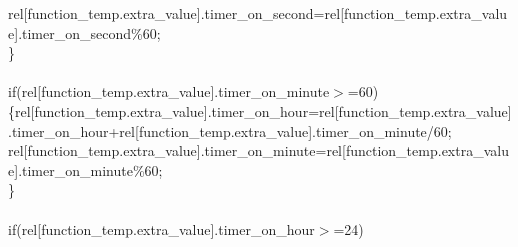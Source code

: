 \documentclass[a4paper, 12pt]{article}
\newcommand\SPC{\hspace*{0.6em}}
\newcommand{\CppAIdentifier}[1]{\textcolor[rgb]{0,1,0}{#1}}
\newcommand{\CppANumber}[1]{\textcolor[rgb]{0,0,1}{#1}}
\newcommand{\CppAReservedWord}[1]{\textcolor[rgb]{0,0.5,0}{#1}}
\newcommand{\CppASpace}[1]{\textcolor[rgb]{1,1,1}{\colorbox[rgb]{0,0,0}{#1}}}
\newcommand{\CppASymbol}[1]{\textcolor[rgb]{1,0,0}{#1}}
\begin{document}
\begin{ttfamily}
\CppASpace{\SPC \SPC \SPC }\CppAIdentifier{rel}\CppASymbol{[}\CppAIdentifier{function\_temp}\CppASymbol{.}\CppAIdentifier{extra\_value}\CppASymbol{]}\CppASymbol{.}\CppAIdentifier{timer\_on\_second}\CppASpace{\SPC }\CppASymbol{=}\CppASpace{\SPC }\CppAIdentifier{rel}\CppASymbol{[}\CppAIdentifier{function\_temp}\CppASymbol{.}\CppAIdentifier{extra\_value}\CppASymbol{]}\CppASymbol{.}\CppAIdentifier{timer\_on\_second}\CppASpace{\SPC }\CppASymbol{\%}\CppASpace{\SPC }\CppANumber{60}\CppASymbol{;}\\
\CppASpace{\SPC \SPC }\CppASymbol{\}}\\
\\
\CppASpace{\SPC \SPC }\CppAReservedWord{if}\CppASymbol{(}\CppAIdentifier{rel}\CppASymbol{[}\CppAIdentifier{function\_temp}\CppASymbol{.}\CppAIdentifier{extra\_value}\CppASymbol{]}\CppASymbol{.}\CppAIdentifier{timer\_on\_minute}\CppASpace{\SPC }\CppASymbol{$>$=}\CppASpace{\SPC }\CppANumber{60}\CppASymbol{)}\\
\CppASpace{\SPC \SPC }\CppASymbol{\{}\CppASpace{\SPC }\CppAIdentifier{rel}\CppASymbol{[}\CppAIdentifier{function\_temp}\CppASymbol{.}\CppAIdentifier{extra\_value}\CppASymbol{]}\CppASymbol{.}\CppAIdentifier{timer\_on\_hour}\CppASpace{\SPC }\CppASymbol{=}\CppASpace{\SPC }\CppAIdentifier{rel}\CppASymbol{[}\CppAIdentifier{function\_temp}\CppASymbol{.}\CppAIdentifier{extra\_value}\CppASymbol{]}\CppASymbol{.}\CppAIdentifier{timer\_on\_hour}\CppASpace{\SPC }\CppASymbol{+}\CppASpace{\SPC }\CppAIdentifier{rel}\CppASymbol{[}\CppAIdentifier{function\_temp}\CppASymbol{.}\CppAIdentifier{extra\_value}\CppASymbol{]}\CppASymbol{.}\CppAIdentifier{timer\_on\_minute}\CppASpace{\SPC }\CppASymbol{/}\CppASpace{\SPC }\CppANumber{60}\CppASpace{\SPC }\CppASymbol{;}\\
\CppASpace{\SPC \SPC \SPC \SPC }\CppAIdentifier{rel}\CppASymbol{[}\CppAIdentifier{function\_temp}\CppASymbol{.}\CppAIdentifier{extra\_value}\CppASymbol{]}\CppASymbol{.}\CppAIdentifier{timer\_on\_minute}\CppASpace{\SPC }\CppASymbol{=}\CppASpace{\SPC }\CppAIdentifier{rel}\CppASymbol{[}\CppAIdentifier{function\_temp}\CppASymbol{.}\CppAIdentifier{extra\_value}\CppASymbol{]}\CppASymbol{.}\CppAIdentifier{timer\_on\_minute}\CppASpace{\SPC }\CppASymbol{\%}\CppASpace{\SPC }\CppANumber{60}\CppASymbol{;}\\
\CppASpace{\SPC \SPC }\CppASymbol{\}}\\
\\
\CppASpace{\SPC \SPC }\CppAReservedWord{if}\CppASymbol{(}\CppAIdentifier{rel}\CppASymbol{[}\CppAIdentifier{function\_temp}\CppASymbol{.}\CppAIdentifier{extra\_value}\CppASymbol{]}\CppASymbol{.}\CppAIdentifier{timer\_on\_hour}\CppASpace{\SPC }\CppASymbol{$>$=}\CppASpace{\SPC }\CppANumber{24}\CppASymbol{)}\\

\end{ttfamily}
\end{document}
